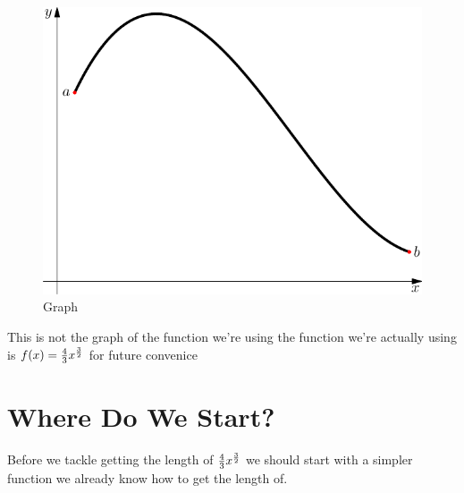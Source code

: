 \documentclass[12pt]{book}
\begin{document}
\begin{figure}[h]
    \centering
    
    \includegraphics{./figures/1.1.pdf}
    
    \caption{Graph}
\end{figure}

\clearpage

This is not the graph of the function we're using the function we're actually using is $f(x) = \frac{4}{3}x^{\frac{3}{2}}$ for future convenice

\chapter{Where Do We Start?}
Before we tackle getting the length of $\frac{4}{3}x^{\frac{3}{2}}$ we should start with a simpler function we already know how to get the length of.
\end{document}
